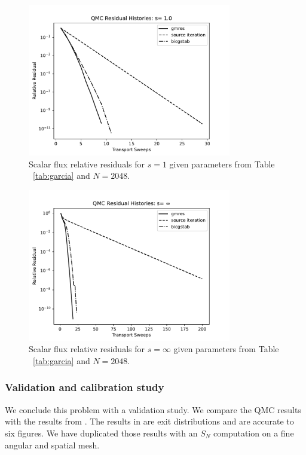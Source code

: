 \begin{figure}[h]
\centerline{
\includegraphics[width=3.5in]{FIGURES/seqone.pdf}
}
\caption{\label{fig:easy} Scalar flux relative residuals for $s=1$ given parameters from Table ~\ref{tab:garcia} and $N=2048$.}
\end{figure}

\begin{figure}[h]
\centerline{
\includegraphics[width=3.5in]{FIGURES/seqinf.pdf}
}
\caption{\label{fig:hard} Scalar flux relative residuals for $s=\infty$ given parameters from Table ~\ref{tab:garcia} and $N=2048$.}
\end{figure}


 
\subsubsection{Validation and calibration study}
\label{validation-and-calibration-study}

We conclude this problem with a validation study. We compare the QMC results with the results from \cite{cesinh}. The results in \cite{cesinh} are exit distributions and are accurate to six figures. We have duplicated those results with an $S_N$ computation on a fine angular and spatial mesh.

